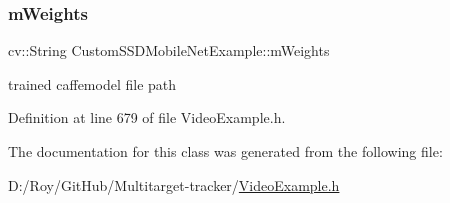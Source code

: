 \subsubsection{\texorpdfstring{m\+Weights}{mWeights}}
{\footnotesize\ttfamily cv\+::\+String Custom\+S\+S\+D\+Mobile\+Net\+Example\+::m\+Weights\hspace{0.3cm}{\ttfamily [private]}}

trained caffemodel file path 

Definition at line 679 of file Video\+Example.\+h.



The documentation for this class was generated from the following file\+:\begin{DoxyCompactItemize}
\item 
D\+:/\+Roy/\+Git\+Hub/\+Multitarget-\/tracker/\mbox{\hyperlink{_video_example_8h}{Video\+Example.\+h}}\end{DoxyCompactItemize}
